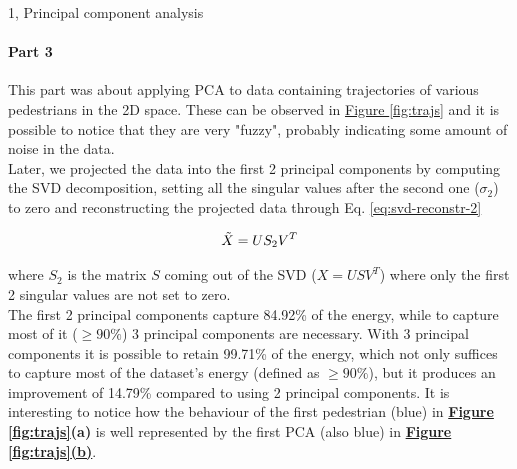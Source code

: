 \documentclass[10pt,a4paper]{article}
\begin{document}
\begin{task}{1, Principal component analysis}
\paragraph{Part 3}
This part was about applying PCA to data containing trajectories of various pedestrians in the 2D space.
These can be observed in \hyperref[fig:plot-traj]{Figure \ref{fig:trajs}} and it is possible to notice that they are very "fuzzy", probably indicating some amount of noise in the data.\\
Later, we projected the data into the first 2 principal components by computing the SVD decomposition, setting all the singular values after the second one ($\sigma_2$) to zero and reconstructing the projected data through Eq. \ref{eq:svd-reconstr-2}

\begin{equation}\label{eq:svd-reconstr-2}
    \Tilde{X} = US_2V^T
\end{equation}

where $S_2$ is the matrix $S$ coming out of the SVD ($X=USV^T$) where only the first 2 singular values are not set to zero.\\
The first 2 principal components capture 84.92\% of the energy, while to capture most of it ($\geq 90\%$) 3 principal components are necessary.
With 3 principal components it is possible to retain 99.71\% of the energy, which not only suffices to capture most of the dataset's energy (defined as $\geq 90\%$), but it produces an improvement of 14.79\% compared to using 2 principal components.
It is interesting to notice how the behaviour of the first pedestrian (blue) in \textbf{\hyperref[fig:trajs]{Figure \ref{fig:trajs}}(a)} is well represented by the first PCA (also blue) in \textbf{\hyperref[fig:trajs]{Figure \ref{fig:trajs}(b)}}.


\end{task}
\end{document}
